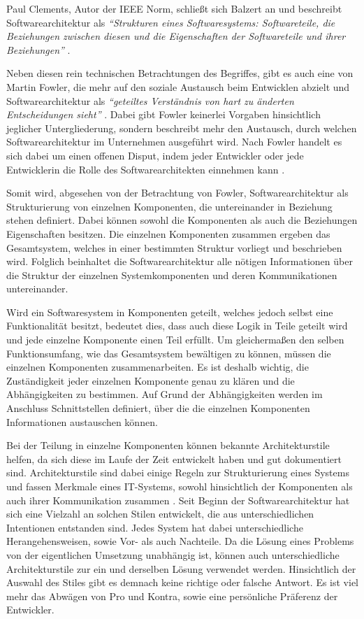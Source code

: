 Paul Clements, Autor der IEEE Norm, schließt sich Balzert an und beschreibt Softwarearchitektur als \textit{\enquote{Strukturen eines Softwaresystems: Softwareteile, die Beziehungen zwischen diesen und die Eigenschaften der Softwareteile und ihrer Beziehungen}} \parencite[][S. 23]{clements_documenting_2010}.

Neben diesen rein technischen Betrachtungen des Begriffes, gibt es auch eine von Martin Fowler, die mehr auf den soziale Austausch beim Entwicklen abzielt und Softwarearchitektur als  \textit{\enquote{geteiltes Verständnis von hart zu änderten Entscheidungen sieht}} \parencite[][S. 3]{fowler_who_2003}. Dabei gibt Fowler keinerlei Vorgaben hinsichtlich jeglicher Untergliederung, sondern beschreibt mehr den Austausch, durch welchen Softwarearchitektur im Unternehmen ausgeführt wird. Nach Fowler handelt es sich dabei um einen offenen Disput, indem jeder Entwickler oder jede Entwicklerin die Rolle des Softwarearchitekten einnehmen kann \parencite[][S. 3 f.]{fowler_who_2003}.

Somit wird, abgesehen von der Betrachtung von Fowler, Softwarearchitektur als Strukturierung von einzelnen Komponenten, die untereinander in Beziehung stehen definiert. Dabei können sowohl die Komponenten als auch die Beziehungen Eigenschaften besitzen. Die einzelnen Komponenten zusammen ergeben das Gesamtsystem, welches in einer bestimmten Struktur vorliegt und beschrieben wird. Folglich beinhaltet die Softwarearchitektur alle nötigen Informationen über die Struktur der einzelnen Systemkomponenten und deren Kommunikationen untereinander.

Wird ein Softwaresystem in Komponenten geteilt, welches jedoch selbst eine Funktionalität besitzt, bedeutet dies, dass auch diese Logik in Teile geteilt wird und jede einzelne Komponente einen Teil erfüllt. Um gleichermaßen den selben Funktionsumfang, wie das Gesamtsystem bewältigen zu können, müssen die einzelnen Komponenten zusammenarbeiten. Es ist deshalb wichtig, die Zuständigkeit jeder einzelnen Komponente genau zu klären und die Abhängigkeiten zu bestimmen. Auf Grund der Abhängigkeiten werden im Anschluss Schnittstellen definiert, über die die einzelnen Komponenten Informationen austauschen können.

Bei der Teilung in einzelne Komponenten können bekannte Architekturstile helfen, da sich diese im Laufe der Zeit entwickelt haben und gut dokumentiert sind. Architekturstile sind dabei einige Regeln zur Strukturierung eines Systems und fassen Merkmale eines IT-Systems, sowohl hinsichtlich der Komponenten als auch ihrer Kommunikation zusammen \parencite[vlg.][S. 102]{starke_effektive_2015}. Seit Beginn der Softwarearchitektur hat sich eine Vielzahl an solchen Stilen entwickelt, die aus unterschiedlichen Intentionen entstanden sind. Jedes System hat dabei unterschiedliche Herangehensweisen, sowie Vor- als auch Nachteile. Da die Lösung eines Problems von der eigentlichen Umsetzung unabhängig ist, können auch unterschiedliche Architekturstile zur ein und derselben Lösung verwendet werden. Hinsichtlich der Auswahl des Stiles gibt es demnach keine richtige oder falsche Antwort. Es ist viel mehr das Abwägen von Pro und Kontra, sowie eine persönliche Präferenz der Entwickler.

